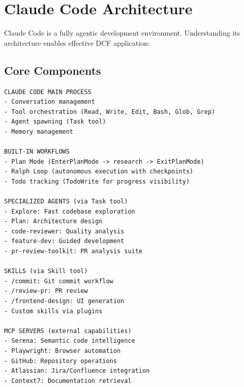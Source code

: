 \chapter{Claude Code Architecture}

Claude Code is a fully agentic development environment. Understanding its architecture enables effective DCF application:

\section{Core Components}

\begin{lstlisting}
CLAUDE CODE MAIN PROCESS
- Conversation management
- Tool orchestration (Read, Write, Edit, Bash, Glob, Grep)
- Agent spawning (Task tool)
- Memory management

BUILT-IN WORKFLOWS
- Plan Mode (EnterPlanMode -> research -> ExitPlanMode)
- Ralph Loop (autonomous execution with checkpoints)
- Todo tracking (TodoWrite for progress visibility)

SPECIALIZED AGENTS (via Task tool)
- Explore: Fast codebase exploration
- Plan: Architecture design
- code-reviewer: Quality analysis
- feature-dev: Guided development
- pr-review-toolkit: PR analysis suite

SKILLS (via Skill tool)
- /commit: Git commit workflow
- /review-pr: PR review
- /frontend-design: UI generation
- Custom skills via plugins

MCP SERVERS (external capabilities)
- Serena: Semantic code intelligence
- Playwright: Browser automation
- GitHub: Repository operations
- Atlassian: Jira/Confluence integration
- Context7: Documentation retrieval
\end{lstlisting}

